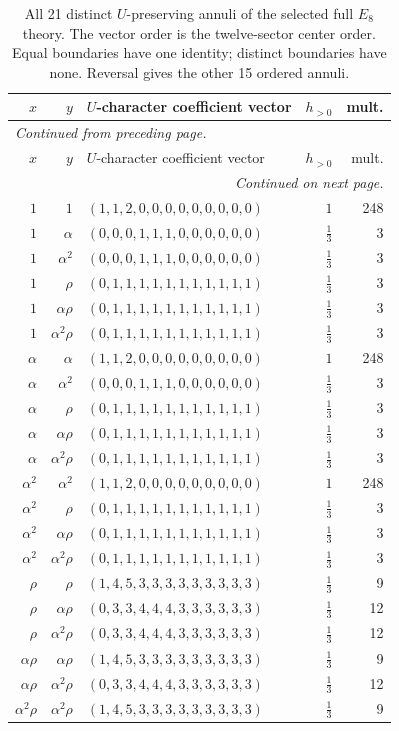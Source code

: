 \begingroup\footnotesize
\setlength{\tabcolsep}{5pt}
\begin{longtable}{rrlrr}
\caption{All 21 distinct $U$-preserving annuli of the selected full $E_8$ theory. The vector order is the twelve-sector center order. Equal boundaries have one identity; distinct boundaries have none. Reversal gives the other 15 ordered annuli.}\label{expphysics:e8-annuli}\\
\toprule
$x$ & $y$ & $U$-character coefficient vector & $h_{>0}$ & mult.\\
\midrule
\endfirsthead
\multicolumn{5}{l}{\small\itshape Continued from preceding page.}\\
\toprule
$x$ & $y$ & $U$-character coefficient vector & $h_{>0}$ & mult.\\
\midrule
\endhead
\midrule
\multicolumn{5}{r}{\small\itshape Continued on next page.}\\
\endfoot
\bottomrule
\endlastfoot
$1$ & $1$ & $(1,1,2,0,0,0,0,0,0,0,0,0)$ & $1$ & 248\\
$1$ & $\alpha$ & $(0,0,0,1,1,1,0,0,0,0,0,0)$ & $\frac{1}{3}$ & 3\\
$1$ & $\alpha^2$ & $(0,0,0,1,1,1,0,0,0,0,0,0)$ & $\frac{1}{3}$ & 3\\
$1$ & $\rho$ & $(0,1,1,1,1,1,1,1,1,1,1,1)$ & $\frac{1}{3}$ & 3\\
$1$ & $\alpha\rho$ & $(0,1,1,1,1,1,1,1,1,1,1,1)$ & $\frac{1}{3}$ & 3\\
$1$ & $\alpha^2\rho$ & $(0,1,1,1,1,1,1,1,1,1,1,1)$ & $\frac{1}{3}$ & 3\\
$\alpha$ & $\alpha$ & $(1,1,2,0,0,0,0,0,0,0,0,0)$ & $1$ & 248\\
$\alpha$ & $\alpha^2$ & $(0,0,0,1,1,1,0,0,0,0,0,0)$ & $\frac{1}{3}$ & 3\\
$\alpha$ & $\rho$ & $(0,1,1,1,1,1,1,1,1,1,1,1)$ & $\frac{1}{3}$ & 3\\
$\alpha$ & $\alpha\rho$ & $(0,1,1,1,1,1,1,1,1,1,1,1)$ & $\frac{1}{3}$ & 3\\
$\alpha$ & $\alpha^2\rho$ & $(0,1,1,1,1,1,1,1,1,1,1,1)$ & $\frac{1}{3}$ & 3\\
$\alpha^2$ & $\alpha^2$ & $(1,1,2,0,0,0,0,0,0,0,0,0)$ & $1$ & 248\\
$\alpha^2$ & $\rho$ & $(0,1,1,1,1,1,1,1,1,1,1,1)$ & $\frac{1}{3}$ & 3\\
$\alpha^2$ & $\alpha\rho$ & $(0,1,1,1,1,1,1,1,1,1,1,1)$ & $\frac{1}{3}$ & 3\\
$\alpha^2$ & $\alpha^2\rho$ & $(0,1,1,1,1,1,1,1,1,1,1,1)$ & $\frac{1}{3}$ & 3\\
$\rho$ & $\rho$ & $(1,4,5,3,3,3,3,3,3,3,3,3)$ & $\frac{1}{3}$ & 9\\
$\rho$ & $\alpha\rho$ & $(0,3,3,4,4,4,3,3,3,3,3,3)$ & $\frac{1}{3}$ & 12\\
$\rho$ & $\alpha^2\rho$ & $(0,3,3,4,4,4,3,3,3,3,3,3)$ & $\frac{1}{3}$ & 12\\
$\alpha\rho$ & $\alpha\rho$ & $(1,4,5,3,3,3,3,3,3,3,3,3)$ & $\frac{1}{3}$ & 9\\
$\alpha\rho$ & $\alpha^2\rho$ & $(0,3,3,4,4,4,3,3,3,3,3,3)$ & $\frac{1}{3}$ & 12\\
$\alpha^2\rho$ & $\alpha^2\rho$ & $(1,4,5,3,3,3,3,3,3,3,3,3)$ & $\frac{1}{3}$ & 9\\
\end{longtable}
\endgroup

